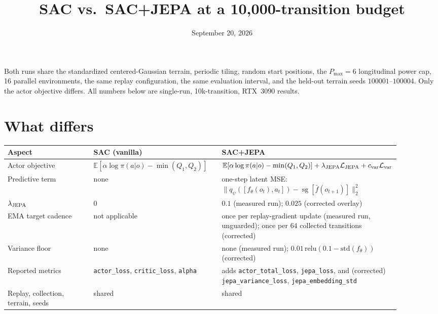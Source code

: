 \documentclass[11pt]{article}
\title{SAC vs.\ SAC+JEPA at a 10{,}000-transition budget}
\author{}
\date{September 20, 2026}
\newcommand{\code}[1]{\texttt{#1}}
\begin{document}
\maketitle

\noindent
Both runs share the standardized centered-Gaussian terrain, periodic tiling,
random start positions, the $P_{\max}=6$ longitudinal power cap, 16 parallel
environments, the same replay configuration, the same evaluation interval, and
the held-out terrain seeds $100001$--$100004$. Only the actor objective differs.
All numbers below are single-run, 10k-transition, RTX~3090 results.

\section{What differs}

\begin{center}
\begin{tabular}{>{\raggedright\arraybackslash}p{0.24\linewidth}
                >{\raggedright\arraybackslash}p{0.33\linewidth}
                >{\raggedright\arraybackslash}p{0.33\linewidth}}
\toprule
\textbf{Aspect} & \textbf{SAC (vanilla)} & \textbf{SAC+JEPA} \\
\midrule
Actor objective & $\mathbb E[\alpha\log\pi(a|o)-\min(Q_1,Q_2)]$ &
$\mathbb E[\alpha\log\pi(a|o)-\min(Q_1,Q_2)] + \lambda_{\rm JEPA}\mathcal L_{\rm JEPA} + c_{\rm var}\mathcal L_{\rm var}$ \\
Predictive term & none &
one-step latent MSE: $\lVert q_\psi([f_\theta(o_t),a_t])-\operatorname{sg}[\bar f(o_{t+1})]\rVert_2^2$ \\
$\lambda_{\rm JEPA}$ & $0$ & $0.1$ (measured run); $0.025$ (corrected overlay) \\
EMA target cadence & not applicable &
once per replay-gradient update (measured run, unguarded);
once per $64$ collected transitions (corrected) \\
Variance floor & none &
none (measured run); $0.01\,\mathrm{relu}(0.1-\mathrm{std}(f_\theta))$ (corrected) \\
Reported metrics & \code{actor\_loss}, \code{critic\_loss}, \code{alpha} &
adds \code{actor\_total\_loss}, \code{jepa\_loss}, and (corrected) \code{jepa\_variance\_loss}, \code{jepa\_embedding\_std} \\
Replay, collection, terrain, seeds & shared & shared \\
\bottomrule
\end{tabular}
\end{center}
\end{document}
